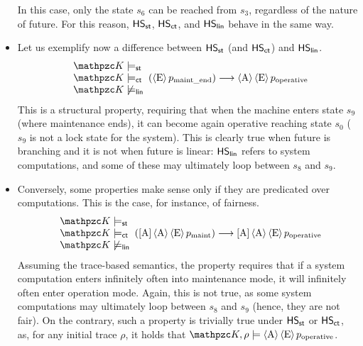 \begin{itemize}
    In this case, only the state $s_6$ can be reached from $s_3$, regardless of the nature of future. For this reason, $\text{\sffamily HS}_{\mathsf{st}}$, $\text{\sffamily HS}_{\mathsf{ct}}$, and $\text{\sffamily HS}_{\mathsf{lin}}$ behave in the same way. 
    
    \item Let us exemplify now a difference between $\text{\sffamily HS}_{\mathsf{st}}$ (and $\text{\sffamily HS}_{\mathsf{ct}}$) and $\text{\sffamily HS}_{\mathsf{lin}}$.
    \[
        \begin{array}{l}
            \Ku\models_\stat \\
            \Ku\models_\LinearPast  \\
            \Ku\not\models_\LinearTime
        \end{array}
        (\hsE p_\text{maint\_end})\longrightarrow \hsA\hsE p_\text{operative}
    \]
    This is a structural property, requiring that when the machine enters state $s_9$ (where maintenance ends), it can become again operative reaching state $s_0$ ($s_9$ is not a lock state for the system). This is clearly true when future is branching and it is not when future is linear: $\text{\sffamily HS}_{\mathsf{lin}}$ refers to system computations, and some of these may ultimately loop between $s_8$ and $s_9$.
    
    \item 
    Conversely, some properties make sense only if they are predicated over computations. This is the case, for instance, of fairness.
    \[
        \begin{array}{l}
            \Ku\models_\stat \\
            \Ku\models_\LinearPast  \\
            \Ku\not\models_\LinearTime
        \end{array}
        (\hsAu\hsA\hsE p_\text{maint})\longrightarrow \hsAu\hsA\hsE p_\text{operative}
    \]
    Assuming the trace-based semantics, the property requires that if a system computation enters infinitely often into maintenance mode, it will infinitely often enter operation mode.
    Again, this is not true, as some system computations may ultimately loop between $s_8$ and $s_9$ (hence, they are not fair). On the contrary, such a property is trivially true under $\text{\sffamily HS}_{\mathsf{st}}$ or $\text{\sffamily HS}_{\mathsf{ct}}$, as, for any initial trace $\rho$, it holds that $\Ku,\rho\models \hsA\hsE p_\text{operative}$.
    

\end{itemize}
